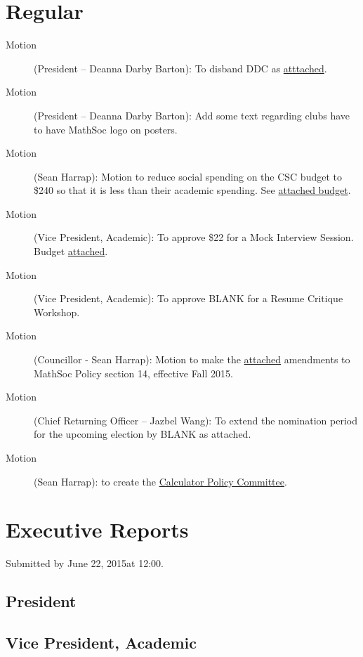 \documentclass[12pt, letterpaper]{article}
\newcommand{\agendaDate}{June 22, 2015} %
\begin{document}
\section*{Regular}
\begin{description}
	\item[Motion] (President -- Deanna Darby Barton): To disband DDC as \hyperref[ddc]{atttached}.
	\item[Motion] (President -- Deanna Darby Barton): Add some text regarding clubs have to have MathSoc logo on posters.
	\item[Motion] (Sean Harrap): Motion to reduce social spending on the CSC budget to \$240 so that it is less than their academic spending. See \hyperref[csc]{attached budget}.
	\item[Motion] (Vice President, Academic): To approve \$22 for a Mock Interview Session. Budget \hyperref[mock]{attached}.
	\item[Motion] (Vice President, Academic): To approve BLANK for a Resume Critique Workshop.
	\item[Motion] (Councillor - Sean Harrap): Motion to make the \hyperref[cif]{attached} amendments to MathSoc Policy section 14, effective Fall 2015.
	\item[Motion] (Chief Returning Officer -- Jazbel Wang): To extend the nomination period for the upcoming election by BLANK as attached.
	\item[Motion](Sean Harrap): to create the \hyperref[calc]{Calculator Policy Committee}.
	
\end{description}

\newpage


\newpage

\section*{Executive Reports}
Submitted by \agendaDate at 12:00.

\subsection*{President}


\subsection*{Vice President, Academic}

\end{document}
